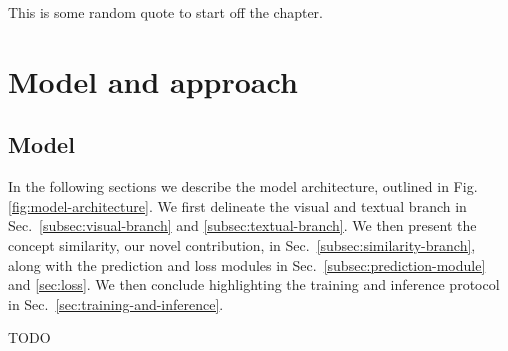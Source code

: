 \begin{savequote}[75mm]
This is some random quote to start off the chapter.
\end{savequote}

\chapter{Model and approach}
\label{ch:model}


\section{Model}

In the following sections we describe the model architecture, outlined
in Fig.\ref{fig:model-architecture}. We first delineate the visual and
textual branch in Sec.~\ref{subsec:visual-branch} and
\ref{subsec:textual-branch}. We then present the concept similarity,
our novel contribution, in Sec.~\ref{subsec:similarity-branch}, along
with the prediction and loss modules in
Sec.~\ref{subsec:prediction-module} and \ref{sec:loss}. We then
conclude highlighting the training and inference protocol in
Sec.~\ref{sec:training-and-inference}.

TODO 

